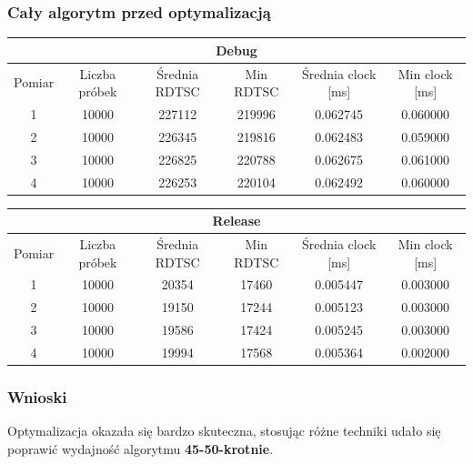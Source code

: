 \documentclass{article}
\begin{document}
	\subsubsection{Cały algorytm przed optymalizacją}
	\begin{center}
		\begin{tabular}{|c|c|c|c|c|c|} \hline
			\multicolumn{6}{|c|}{Debug} \\\hline
			Pomiar  & Liczba próbek & Średnia RDTSC & Min RDTSC & Średnia clock [ms] & Min clock [ms] \\\hline
			\hline
			1 & 10000 & 227112 & 219996 & 0.062745 & 0.060000 \\\hline
			2 & 10000 & 226345 & 219816 & 0.062483 & 0.059000 \\\hline
			3 & 10000 & 226825 & 220788 & 0.062675 & 0.061000 \\\hline
			4 & 10000 & 226253 & 220104 & 0.062492 & 0.060000 \\\hline
			
		\end{tabular}
	\end{center}
	\begin{center}
		\begin{tabular}{|c|c|c|c|c|c|} \hline
			\multicolumn{6}{|c|}{Release} \\\hline
			Pomiar  & Liczba próbek & Średnia RDTSC & Min RDTSC & Średnia clock [ms] & Min clock [ms] \\\hline
			\hline
			1 & 10000 & 20354 & 17460 & 0.005447 & 0.003000 \\\hline
			2 & 10000 & 19150 & 17244 & 0.005123 & 0.003000 \\\hline
			3 & 10000 & 19586 & 17424 & 0.005245 & 0.003000 \\\hline
			4 & 10000 & 19994 & 17568 & 0.005364 & 0.002000 \\\hline
			
		\end{tabular}
	\end{center}
	
	\subsubsection{Wnioski}
	Optymalizacja okazała się bardzo skuteczna, stosując różne techniki udało się poprawić wydajność algorytmu \textbf{45-50-krotnie}.
	
	
\end{document}
